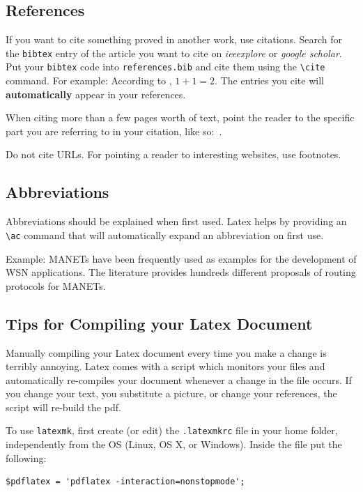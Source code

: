 \subsection{References}

If you want to cite something proved in another work, use citations.
Search for the \texttt{bibtex} entry of the article you want to cite on \textit{ieeexplore} or \textit{google scholar}.
Put your \texttt{bibtex} code into \texttt{references.bib} and cite them using the \verb|\cite| command.
For example: According to \cite{akyildiz2002survey}, $1 + 1 = 2$.
The entries you cite will \textbf{automatically} appear in your references.

When citing more than a few pages worth of text, point the reader to the specific part you are referring to in your citation, like so:~\cite[Table IV]{dietrich2009lifetime}.

Do not cite URLs. For pointing a reader to interesting websites, use footnotes.

\subsection{Abbreviations}

Abbreviations should be explained when first used.
Latex helps by providing an \verb|\ac| command that will automatically expand an abbreviation on first use.

Example: \acp{MANET} have been frequently used as examples for the development of \ac{WSN} applications.
The literature provides hundreds different proposals of routing protocols for \acp{MANET}.
\subsection{Tips for Compiling your Latex Document}

Manually compiling your Latex document every time you make a change is terribly annoying.
Latex comes with a script which monitors your files and automatically re-compiles your document whenever a change in the file occurs.
If you change your text, you substitute a picture, or change your references, the script will re-build the pdf.

To use \texttt{latexmk}, first create (or edit) the \texttt{.latexmkrc} file in your home folder, independently from the OS (Linux, OS X, or Windows).
Inside the file put the following:

{\footnotesize
\begin{verbatim}
$pdflatex = 'pdflatex -interaction=nonstopmode';
\end{verbatim}
}


